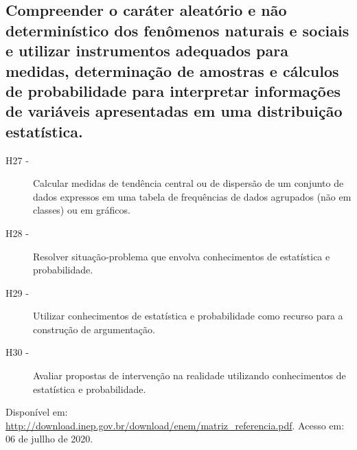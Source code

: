    \subsection*{Compreender o caráter aleatório e não determinístico dos fenômenos naturais e sociais e
    	utilizar instrumentos adequados para medidas, determinação de amostras e cálculos de probabilidade para
    	interpretar informações de variáveis apresentadas em uma distribuição estatística.}
    	\begin{description}
    		\item [H27 -]Calcular medidas de tendência central ou de dispersão de um conjunto de dados expressos em uma tabela de frequências de dados agrupados
    		(não em classes) ou em gráficos.
    		\item [H28 -]Resolver situação-problema que envolva conhecimentos de estatística e probabilidade.
    		\item [H29 -]Utilizar conhecimentos de estatística e probabilidade como recurso para a construção de argumentação.
    		\item [H30 -]Avaliar propostas de intervenção na realidade utilizando conhecimentos de estatística e probabilidade.
    	\end{description}

\vfill
\noindent Disponível em: \url{http://download.inep.gov.br/download/enem/matriz_referencia.pdf}. Acesso em: 06 de jullho de 2020.